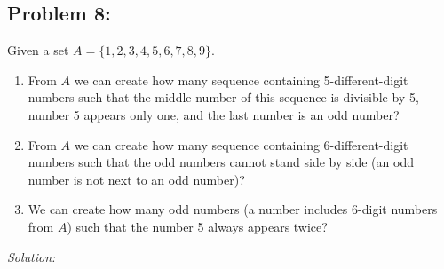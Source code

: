 \documentclass[a4paper]{article}
\begin{document}
	
	\subsection*{Problem 8:}
	Given a set $A = \{1,2,3,4,5,6,7,8,9\}$.
	\begin{enumerate}
		\item From $A$ we can create how many sequence containing 5-different-digit numbers such that the middle number of this sequence is divisible by 5, number 5 appears only one, and the last number is an odd number?
		\item From $A$ we can create how many sequence containing 6-different-digit numbers such that the odd numbers cannot stand side by side (an odd number is not next to an odd number)?
		\item We can create how many odd numbers (a number includes 6-digit numbers from $A$) such that the number 5 always appears twice?
	\end{enumerate} 
	\textit{Solution:} \\
\end{document}
